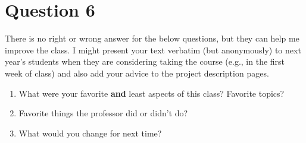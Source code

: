 \documentclass[10pt]{article}
\begin{document}
\newpage
\section{Question 6}


There is no right or wrong answer for the below questions, but they can help me improve the class. 
I might present your text verbatim (but anonymously) to next year's students when they are considering taking the course (e.g., in the first week of class) and also add your advice to the project description pages.

\begin{enumerate}
\item What were your favorite \textbf{and} least aspects of this class? Favorite topics?
\item Favorite things the professor did or didn't do?
\item What would you change for next time?
\end{enumerate}
\end{document}
